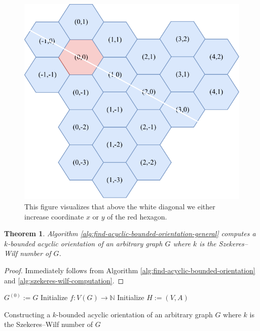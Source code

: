 \documentclass[a4paper, 12pt]{article}
\newtheorem{theo}[lem]{Theorem}
\begin{document}
\begin{figure}[!h]
\centering
\includegraphics[scale=1]{figures/proof-k-band-buffering.pdf}
\caption{This figure visualizes that above the white diagonal we either increase coordinate $x$ or $y$ of the red hexagon.}\label{fig:extremal-proof}
\end{figure}


\begin{theo} Algorithm \ref{alg:find-acyclic-bounded-orientation-general} computes a $k$-bounded acyclic orientation of an arbitrary graph $G$ where $k$ is the Szekeres\---Wilf number of $G$.
\end{theo}

\begin{proof} Immediately follows from Algorithm \ref{alg:find-acyclic-bounded-orientation} and \ref{alg:szekeres-wilf-computation}.
\end{proof}

\begin{algorithm}[h!]\label{alg:find-acyclic-bounded-orientation-general}
 $G^{(0)} := G$\;
 Initialize $f \colon V(G) \to \mathbb{N}$\;
 Initialize $H:=(V,A)$\;
 \caption{Constructing a $k$-bounded acyclic orientation of an arbitrary graph $G$ where $k$ is the Szekeres\---Wilf number of $G$}
\end{algorithm}
\end{document}
